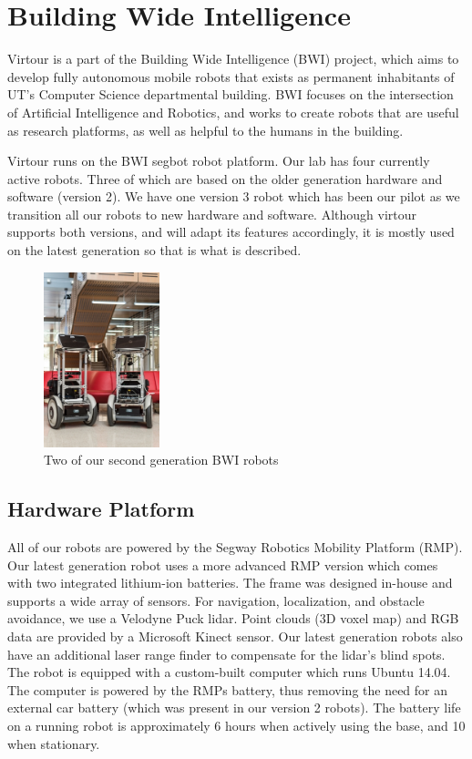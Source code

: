 \documentclass[
  oneside,
  11pt, a4paper,
  footinclude=true,
  headinclude=true,
  cleardoublepage=empty
]{article}
\begin{document}
\section{Building Wide Intelligence}

Virtour is a part of the Building Wide Intelligence (BWI) project, which aims
to develop fully autonomous mobile robots that exists as permanent inhabitants
of UT's Computer Science departmental building. BWI focuses on the intersection
of Artificial Intelligence and Robotics, and works to create robots that are
useful as research platforms, as well as helpful to the humans in the building.

Virtour runs on the BWI segbot robot platform. Our lab has four currently
active robots. Three of which are based on the older generation hardware and
software (version 2). We have one version 3 robot which has been our pilot as
we transition all our robots to new hardware and software. Although virtour
supports both versions, and will adapt its features accordingly, it is mostly
used on the latest generation so that is what is described.

\begin{figure}
\centering
\includegraphics[height=2in]{bwi}
\caption{Two of our second generation BWI robots}
\end{figure}

\subsection{Hardware Platform}

All of our robots are powered by the Segway Robotics Mobility Platform (RMP).
Our latest generation robot uses a more advanced RMP version which comes with
two integrated lithium-ion batteries. The frame was designed in-house and
supports a wide array of sensors. For navigation, localization, and obstacle
avoidance, we use a Velodyne Puck lidar. Point clouds (3D voxel map) and RGB
data are provided by a Microsoft Kinect sensor. Our latest generation robots
also have an additional laser range finder to compensate for the lidar's blind
spots. The robot is equipped with a custom-built computer which runs Ubuntu
14.04. The computer is powered by the RMPs battery, thus removing the need for
an external car battery (which was present in our version 2 robots).  The
battery life on a running robot is approximately 6 hours when actively using
the base, and 10 when stationary.
\end{document}
